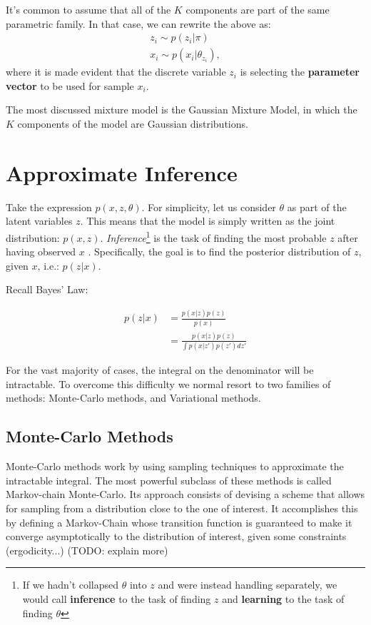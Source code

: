 It's common to assume that all of the $K$ components are part of the same
parametric family. In that case, we can rewrite the above as:
\begin{align}
    z_i \sim p(z_i | \pi) \\
    x_i \sim p(x_i | \theta_{z_i}),
\end{align} where it is made evident that the discrete variable $z_i$ is selecting
the \textbf{parameter vector} to be used for sample $x_i$.

The most discussed mixture model is the Gaussian Mixture Model, in which the $K$
components of the model are Gaussian distributions.

\section{Approximate Inference}
\label{section:probmodelinf}
Take the expression $p(x, z, \theta)$. For simplicity, let us consider $\theta$
as part of the latent variables $z$. This means that the model is simply written
as the joint distribution: $p(x, z)$. \emph{Inference}\footnote{If we hadn't collapsed
$\theta$ into $z$ and were instead handling separately, we would call \textbf{inference}
to the task of finding $z$ and \textbf{learning} to the task of finding $\theta$}
is the task of finding the most probable $z$ after having observed $x$ . Specifically,
the goal is to find the posterior distribution of $z$, given $x$, i.e.: $p(z|x)$.

Recall Bayes' Law:

\begin{align}
    p(z|x) &= \frac{p(x|z)p(z)}{p(x)} \\
           &= \frac{p(x|z)p(z)}{\int p(x|z')p(z') dz'}
\end{align}

For the vast majority of cases, the integral on the denominator will be
intractable. To overcome this difficulty we normal resort to two families
of methods: Monte-Carlo methods, and Variational methods.

\subsection{Monte-Carlo Methods}
\label{subsection:mcmc}

Monte-Carlo methods work by using sampling techniques to approximate the
intractable integral. The most powerful subclass of these methods is called
Markov-chain Monte-Carlo. Its approach consists of devising a scheme that
allows for sampling from a distribution close to the one of interest. It
accomplishes this by defining a Markov-Chain whose transition function 
is guaranteed to make it converge asymptotically to the distribution of interest,
given some constraints (ergodicity...) (TODO: explain more)

